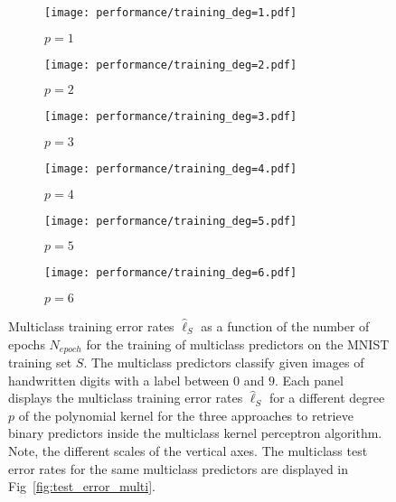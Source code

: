 \begin{figure}[h!]
    \begin{subfigure}[t]{0.49\textwidth}
        \centering
        \texttt{[image: performance/training\_deg=1.pdf]} 
        \caption{$p = 1$}
    \end{subfigure}
    \hfill
    \begin{subfigure}[t]{0.49\textwidth}
        \centering
        \texttt{[image: performance/training\_deg=2.pdf]} 
        \caption{$p = 2$}
    \end{subfigure}
    \par\bigskip
        \begin{subfigure}[t]{0.49\textwidth}
        \centering
        \texttt{[image: performance/training\_deg=3.pdf]} 
        \caption{$p = 3$}
    \end{subfigure}
    \hfill
    \begin{subfigure}[t]{0.49\textwidth}
        \centering
        \texttt{[image: performance/training\_deg=4.pdf]} 
        \caption{$p = 4$}
    \end{subfigure}
    \par\bigskip
        \begin{subfigure}[t]{0.49\textwidth}
        \centering
        \texttt{[image: performance/training\_deg=5.pdf]} 
        \caption{$p = 5$}
    \end{subfigure}
    \hfill
    \begin{subfigure}[t]{0.49\textwidth}
        \centering
        \texttt{[image: performance/training\_deg=6.pdf]} 
        \caption{$p = 6$}
    \end{subfigure}
    \caption{Multiclass training error rates $\hat{\ell}_{S}$ as a function of the number of epochs $N_{epoch}$ for the training of multiclass predictors on the MNIST training set $S$. The multiclass predictors classify given images of handwritten digits with a label between $0$ and $9$. Each panel displays the multiclass training error rates $\hat{\ell}_{S}$ for a different degree $p$ of the polynomial kernel for the three approaches to retrieve binary predictors inside the multiclass kernel perceptron algorithm. Note, the different scales of the vertical axes. The multiclass test error rates for the same multiclass predictors are displayed in Fig~\ref{fig:test_error_multi}.}
    \label{fig:train_error_multi}
\end{figure}

